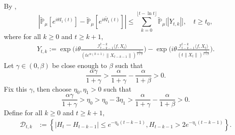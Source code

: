 \documentclass[12pt,a4paper]{amsart}
\theoremstyle{plain}
\theoremstyle{definition}
\numberwithin{equation}{section}
\begin{document}
By \cite[Lemma 3.4.3]{Durrett2010Probability},
\begin{equation}\label{ineq: control of I1t}
    |\mathbb{\tilde{P}}_{\mu}[e^{i\theta I_1(t)}] - \mathbb{\tilde{P}}_{\mu} [e^{i\theta\tilde{I}_1(t)}]|
    \leq \sum_{k=0}^{\lfloor t-\ln t \rfloor}\mathbb{\tilde{P}}_{\mu}\big[|Y_{t,k}|\big],
    \quad t\geq t_0,
\end{equation}
    where for all $k \geq 0$ and $t\geq k+1$,
\begin{align*}
    Y_{t,k}
    :=\exp\Big(i\theta\frac{\mathcal I_{t-k-1}^{t-k}\langle f ,X_t\rangle}{(t e^{\alpha(k+1)}\|X_{t-k-1}\|)^{\frac{1}{1+\beta}}}\Big)-\exp\Big(i\theta\frac{\mathcal I_{t-k-1}^{t-k}\langle f ,X_t\rangle}{(t\|X_t\|)^{\frac{1}{1+\beta}}}\Big).
\end{align*}
    Let $\gamma \in (0,\beta)$ be close enough to $\beta$ such that
\[
    \frac{\alpha \gamma}{1+\gamma} > \frac{\alpha}{1+\gamma} - \frac{\alpha}{1+\beta} > 0.
\]
    Fix this $\gamma$, then choose $\eta_0,\eta_1>0$ such that
\[
    \frac{\alpha \gamma}{1+\gamma} >\eta_0 > \eta_0 - 3\eta_1 > \frac{\alpha}{1+\gamma} - \frac{\alpha}{1+\beta} > 0.
\]
    Define for all $k \geq 0$ and $t\geq k+1$,
\begin{equation}\begin{split}
\label{def: Dtk}
    \mathcal{D}_{t,k}&:=\left\{|H_t-H_{t-k-1}|\leq  e^{-\eta_0 (t-k-1)}, H_{t-k-1}> 2e^{-\eta_1(t-k-1)}\right\}.
\end{split}\end{equation}
\end{document}
